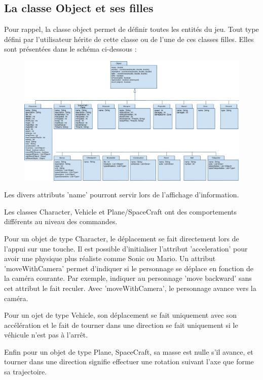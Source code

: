 \subsection{La classe Object et ses filles}

Pour rappel, la classe object permet de définir toutes les entités du jeu.
Tout type défini par l'utilisateur hérite de cette classe ou de l'une de ces classes filles.
Elles sont présentées dans le schéma ci-dessous :

\begin{figure}[h]
 \centering
 \includegraphics[width=\textwidth]{img/objectclass}
\end{figure}

Les divers attributs 'name' pourront servir lors de l'affichage d'information.

Les classes Character, Vehicle et Plane/SpaceCraft ont des comportements différents au niveau des commandes.

Pour un objet de type Character, le déplacement se fait directement lors de l'appui sur une touche. 
Il est possible d'initialiser l'attribut 'acceleration' pour avoir une physique plus réaliste comme Sonic ou Mario.
Un attribut 'moveWithCamera' permet d'indiquer si le personnage se déplace en fonction de la caméra courante. 
Par exemple, indiquer au personnage 'move backward' sans cet attribut le fait reculer.
Avec 'moveWithCamera', le personnage avance vers la caméra.

Pour un ojet de type Vehicle, son déplacement se fait uniquement avec son accélération et le fait de tourner dans une direction
 se fait uniquement si le véhicule n'est pas à l'arrêt.

Enfin pour un objet de type Plane, SpaceCraft, sa masse est nulle s'il avance, et tourner dans une direction signifie
effectuer une rotation suivant l'axe que forme sa trajectoire.

